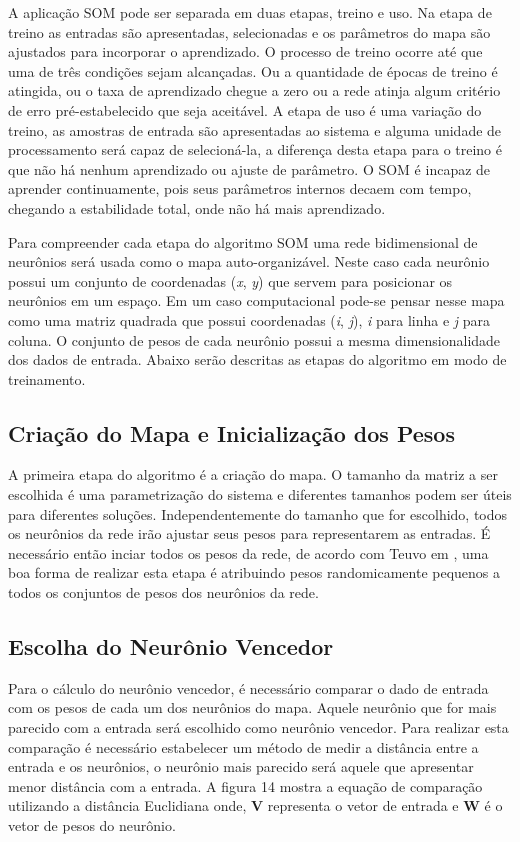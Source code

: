 A aplicação SOM pode ser separada em duas etapas, treino e uso. Na etapa de treino as entradas são apresentadas, selecionadas e os parâmetros do mapa são ajustados para incorporar o aprendizado. O processo de treino ocorre até que uma de três condições sejam alcançadas. Ou a quantidade de épocas de treino é atingida, ou o taxa de aprendizado chegue a zero ou a rede atinja algum critério de erro pré-estabelecido que seja aceitável. A etapa de uso é uma variação do treino, as amostras de entrada são apresentadas ao sistema e alguma unidade de processamento será capaz de selecioná-la, a diferença desta etapa para o treino é que não há nenhum aprendizado ou ajuste de parâmetro. O SOM é incapaz de aprender continuamente, pois seus parâmetros internos decaem com tempo, chegando a estabilidade total, onde não há mais aprendizado.

Para compreender cada etapa do algoritmo SOM uma rede bidimensional de neurônios será usada como o mapa auto-organizável. Neste caso cada neurônio possui um conjunto de coordenadas (\textit{x}, \textit{y}) que servem para posicionar os neurônios em um espaço. Em um caso computacional pode-se pensar nesse mapa como uma matriz quadrada que possui coordenadas (\textit{i}, \textit{j}), \textit{i} para linha e \textit{j} para coluna. O conjunto de pesos de cada neurônio possui a mesma dimensionalidade dos dados de entrada. Abaixo serão descritas as etapas do algoritmo em modo de treinamento.

\subsection{Criação do Mapa e Inicialização dos Pesos} 

A primeira etapa do algoritmo é a criação do mapa. O tamanho da matriz a ser escolhida é uma parametrização do sistema e diferentes tamanhos podem ser úteis para diferentes soluções. Independentemente do tamanho que for escolhido, todos os neurônios da rede irão ajustar seus pesos para representarem as entradas. É necessário então inciar todos os pesos da rede, de acordo com Teuvo em , uma boa forma de realizar esta etapa é atribuindo pesos randomicamente pequenos a todos os conjuntos de pesos dos neurônios da rede.

\subsection{Escolha do Neurônio Vencedor} 

Para o cálculo do neurônio vencedor, é necessário comparar o dado de entrada com os pesos de cada um dos neurônios do mapa. Aquele neurônio que for mais parecido com a entrada será escolhido como neurônio vencedor. Para realizar esta comparação é necessário estabelecer um método de medir a distância entre a entrada e os neurônios, o neurônio mais parecido será aquele que apresentar menor distância com a entrada. A figura 14 mostra a equação de comparação utilizando a distância Euclidiana onde, \textbf{V} representa o vetor de entrada e \textbf{W} é o vetor de pesos do neurônio.

